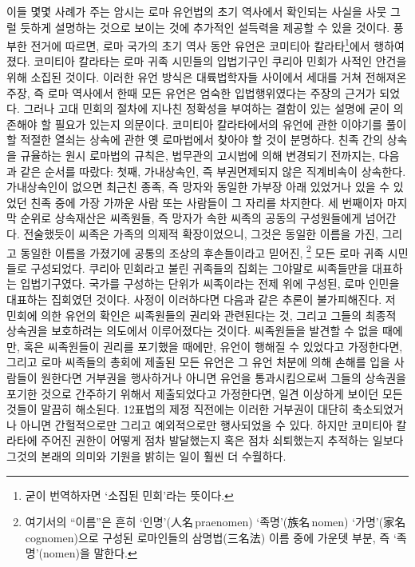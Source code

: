 이들 몇몇 사례가 주는 암시는
로마 유언법의 초기 역사에서 확인되는 사실을 사뭇 그럴 듯하게 설명하는 것으로
보이는 것에 추가적인 설득력을 제공할 수 있을 것이다.
풍부한 전거에 따르면,
로마 국가의 초기 역사 동안 유언은
코미티아 칼라타\footnote{굳이 번역하자면
`소집된 민회'라는 뜻이다.}에서 행하여졌다.
코미티아 칼라타는 로마 귀족 시민들의 입법기구인
쿠리아 민회가 사적인 안건을 위해 소집된 것이다.
이러한 유언 방식은 대륙법학자들 사이에서 세대를 거쳐 전해져온 주장,
즉 로마 역사에서 한때 모든 유언은 엄숙한 입법행위였다는 주장의
근거가 되었다.
그러나 고대 민회의 절차에 지나친 정확성을 부여하는 결함이 있는
설명에 굳이 의존해야 할 필요가 있는지 의문이다.
코미티아 칼라타에서의 유언에 관한 이야기를 풀이할 적절한 열쇠는
상속에 관한 옛 로마법에서 찾아야 할 것이 분명하다.
친족 간의 상속을 규율하는 원시 로마법의 규칙은,
법무관의 고시법에 의해 변경되기 전까지는,
다음과 같은 순서를 따랐다:
첫째, 가내상속인, 즉 부권면제되지 않은
직계비속이 상속한다.
가내상속인이 없으면 최근친 종족,
즉 망자와 동일한 가부장 아래 있었거나 있을 수 있었던 친족 중에
가장 가까운 사람 또는 사람들이
그 자리를 차지한다.
세 번째이자 마지막 순위로 상속재산은 씨족원들, 즉
망자가 속한 씨족의 공동의 구성원들에게 넘어간다.
전술했듯이 씨족은 가족의 의제적 확장이었으니, 그것은
동일한 이름을 가진,
그리고 동일한 이름을 가졌기에 공통의 조상의 후손들이라고 믿어진,%
\footnote{여기서의 ``이름''은 흔히
  `인명'(人名\,praenomen) `족명'(族名\,nomen) `가명'(家名\,cognomen)으로
  구성된 로마인들의 삼명법(三名法) 이름 중에 가운뎃 부분,
  즉 `족명'(nomen)을 말한다.}
모든 로마 귀족 시민들로 구성되었다.
쿠리아 민회라고 불린 귀족들의 집회는 그야말로 씨족들만을 대표하는 입법기구였다.
국가를 구성하는 단위가 씨족이라는 전제 위에 구성된,
로마 인민을 대표하는 집회였던 것이다.
사정이 이러하다면 다음과 같은 추론이 불가피해진다.
저 민회에 의한 유언의 확인은 씨족원들의 권리와 관련된다는 것,
그리고 그들의 최종적 상속권을 보호하려는 의도에서 이루어졌다는 것이다.
씨족원들을 발견할 수 없을 때에만,
혹은 씨족원들이 권리를 포기했을 때에만,
유언이 행해질 수 있었다고 가정한다면,
그리고 로마 씨족들의 총회에 제출된 모든 유언은
그 유언 처분에 의해 손해를 입을 사람들이 원한다면 거부권을 행사하거나
아니면 유언을 통과시킴으로써 그들의 상속권을 포기한 것으로 간주하기 위해서
제출되었다고 가정한다면,
일견 이상하게 보이던 모든 것들이 말끔히 해소된다.
12표법의 제정 직전에는 이러한 거부권이 대단히 축소되었거나
아니면 간헐적으로만 그리고 예외적으로만
행사되었을 수 있다.
하지만 코미티아 칼라타에 주어진 권한이 어떻게 점차 발달했는지 혹은
점차 쇠퇴했는지 추적하는 일보다 그것의 본래의 의미와 기원을 밝히는 일이
훨씬 더 수월하다.

